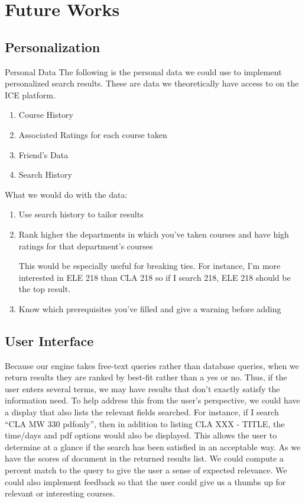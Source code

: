 \documentclass[12pt,letterpaper]{article}
\begin{document}
\section{Future Works}

\subsection{Personalization}

Personal Data
The following is the personal data we could use to implement personalized search results. These are data we theoretically have access to on the ICE platform.
\begin{enumerate}
\item Course History
\item Associated Ratings for each course taken
\item Friend's Data
\item Search History
\end{enumerate}
What we would do with the data:
\begin{enumerate}
\item Use search history to tailor results

\item Rank higher the departments in which you've taken courses and have high ratings for that department's courses

This would be especially useful for breaking ties. For instance, I'm more interested in ELE 218 than CLA 218 so if I search 218, ELE 218 should be the top result. 

\item Know which prerequisites you've filled and give a warning before adding

\end{enumerate}

	
\subsection{User Interface}
Because our engine takes free-text queries rather than database queries, when we return results they are ranked by best-fit rather than a yes or no. Thus, if the user enters several terms, we may have results that don't exactly satisfy the information need. To help address this from the user's perspective, we could have a display that also lists the relevant fields searched. For instance, if I search ``CLA MW 330 pdfonly'', then in addition to listing CLA XXX - TITLE, the time/days and pdf options would also be displayed. This allows the user to determine at a glance if the search has been satisfied in an acceptable way. 
As we have the scores of document in the returned results list. We could compute a percent match to the query to give the user a sense of expected relevance. We could also implement feedback so that the user could give us a thumbs up for relevant or interesting courses. 
\end{document}
